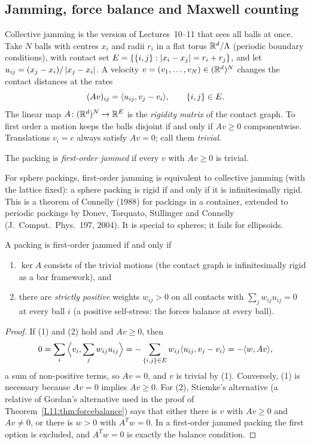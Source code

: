 \subsection{Jamming, force balance and Maxwell counting}

Collective jamming is the version of Lectures~10--11 that sees all balls at once. Take $N$ balls with
centres $x_i$ and radii $r_i$ in a flat torus $\mathbb{R}^d/\Lambda$ (periodic boundary conditions), with contact
set $E=\{\{i,j\}:\left\lvert x_i-x_j \right\rvert=r_i+r_j\}$, and let $u_{ij}=(x_j-x_i)/\left\lvert x_j-x_i \right\rvert$. A velocity
$v=(v_1,\dots,v_N)\in(\mathbb{R}^d)^N$ changes the contact distances at the rates
\[
  (Av)_{ij}=\langle u_{ij}, v_j-v_i\rangle,\qquad\{i,j\}\in E.
\]
The linear map $A\colon(\mathbb{R}^d)^N\to\mathbb{R}^E$ is the \emph{rigidity matrix} of the contact graph. To first order a
motion keeps the balls disjoint if and only if $Av\ge0$ componentwise. Translations $v_i=c$ always
satisfy $Av=0$; call them \emph{trivial}.

\begin{definition}\label{SM:def:jam}
The packing is \emph{first-order jammed} if every $v$ with $Av\ge0$ is trivial.
\end{definition}

For sphere packings, first-order jamming is equivalent to collective jamming (with the lattice fixed):
a sphere packing is rigid if and only if it is infinitesimally rigid. This is a theorem of Connelly (1988)
for packings in a container, extended to periodic packings by Donev, Torquato, Stillinger and Connelly
(J.~Comput.\ Phys.\ 197, 2004). It is special to spheres; it fails for ellipsoids.

\begin{proposition}\label{SM:prop:jam}
A packing is first-order jammed if and only if
\begin{enumerate}[nosep]
\item $\ker A$ consists of the trivial motions (the contact graph is infinitesimally rigid as a bar
  framework), and
\item there are \emph{strictly positive} weights $w_{ij}>0$ on all contacts with
  $\sum_jw_{ij}u_{ij}=0$ at every ball $i$ (a positive self-stress: the forces balance at every ball).
\end{enumerate}
\end{proposition}

\begin{proof}
If (1) and (2) hold and $Av\ge0$, then
\[
  0=\sum_i\Big\langle v_i,\sum_jw_{ij}u_{ij}\Big\rangle=-\sum_{\{i,j\}\in E}w_{ij}\langle u_{ij}, v_j-v_i\rangle=-\langle w, Av\rangle,
\]
a sum of non-positive terms, so $Av=0$, and $v$ is trivial by (1). Conversely, (1) is necessary because
$Av=0$ implies $Av\ge0$. For (2), Stiemke's alternative (a relative of Gordan's alternative used in the
proof of Theorem~\ref{L11:thm:forcebalance}) says that either there is $v$ with $Av\ge0$ and $Av\ne0$, or
there is $w>0$ with $A^Tw=0$. In a first-order jammed packing the first option is excluded, and $A^Tw=0$
is exactly the balance condition.
\end{proof}

